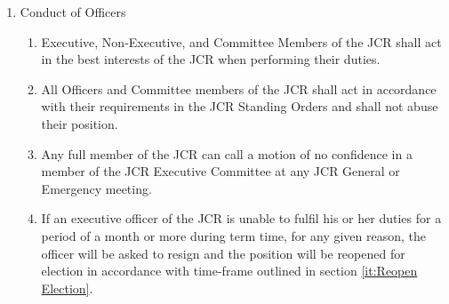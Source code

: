 \begin{enumerate}
    \item Conduct of Officers
    \begin{enumerate}
        \item Executive, Non-Executive, and Committee Members of the JCR shall act in the best interests of the JCR when performing their duties.
        \item All Officers and Committee members of the JCR shall act in accordance with their requirements in the JCR Standing Orders and shall not abuse their position.
        \item Any full member of the JCR can call a motion of no confidence in a member of the JCR Executive Committee at any JCR General or Emergency meeting.
        \item If an executive officer of the JCR is unable to fulfil his or her duties for a period of a month or more during term time, for any given reason, the officer will be asked to resign and the position will be reopened for election in accordance with time-frame outlined in section \ref{it:Reopen Election}.
    \end{enumerate}
\end{enumerate}

